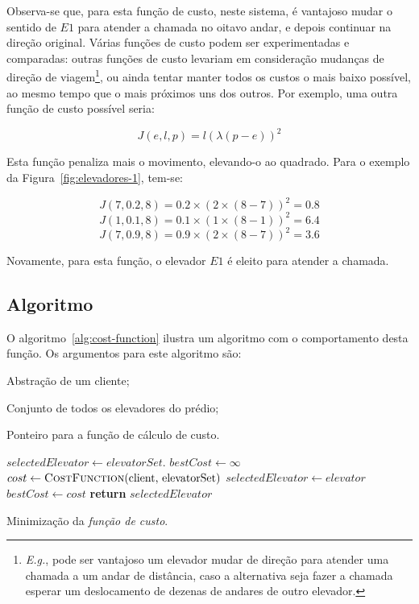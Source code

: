 Observa-se que, para esta função de custo, neste sistema, é vantajoso mudar o
sentido de $E1$ para atender a chamada no oitavo andar, e depois continuar na
direção original. Várias funções de custo podem ser experimentadas e comparadas:
outras funções de custo levariam em consideração mudanças de direção de
viagem\footnote{\textit{E.g.}, pode ser vantajoso um elevador mudar de direção
para atender uma chamada a um andar de distância, caso a alternativa seja fazer a
chamada esperar um deslocamento de dezenas de andares de outro elevador.}, ou
ainda tentar manter todos os custos o mais baixo possível, ao mesmo tempo que o
mais próximos uns dos outros. Por exemplo, uma outra função de custo possível
seria:

\[J(e, l, p) = l(\lambda(p - e))^{2}\]

Esta função penaliza mais o movimento, elevando-o ao quadrado. Para o exemplo da
Figura~\ref{fig:elevadores-1}, tem-se:

\[J(7, 0.2, 8) = 0.2 \times (2 \times (8-7))^2 = 0.8\]
\[J(1, 0.1, 8) = 0.1 \times (1 \times (8-1))^2 = 6.4\]
\[J(7, 0.9, 8) = 0.9 \times (2 \times (8-7))^2 = 3.6\]

Novamente, para esta função, o elevador $E1$ é eleito para atender a chamada.

\subsection{Algoritmo}

O algoritmo~\ref{alg:cost-function} ilustra um algoritmo com o comportamento desta
função. Os argumentos para este algoritmo são:

\begin{description}[leftmargin=!,labelwidth=\widthof{\bfseries $costFunction$}]
  \item[$client$] Abstração de um cliente;
  \item[$elevatorset$] Conjunto de todos os elevadores do prédio;
  \item[$costFunction$] Ponteiro para a função de cálculo de custo.
\end{description}

\begin{algorithm}[htb]
\begin{center}
\begin{algorithmic}[1]
  \State $selectedElevator \leftarrow elevatorSet.$
  \State $bestCost \leftarrow \infty$
    \State $cost \leftarrow \Call{CostFunction}{$client, elevatorSet$}$
      \State $selectedElevator \leftarrow elevator$
      \State $bestCost \leftarrow cost$
    \EndIf
  \EndFor
  \State \textbf{return} $selectedElevator$
\EndFunction
\end{algorithmic}
\end{center}
\caption
   {\label{alg:cost-function}Minimização da \textit{função de custo}.}
\end{algorithm}

